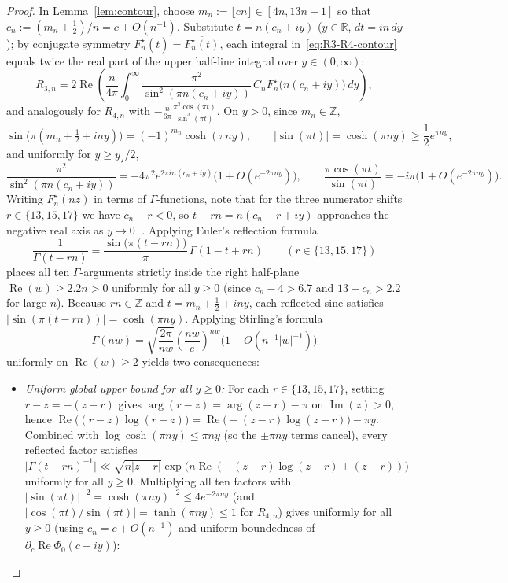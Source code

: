 \documentclass[11pt,reqno]{amsart}
\theoremstyle{definition}
\theoremstyle{remark}
\newcommand{\ZZ}{\mathbb{Z}}
\newcommand{\RR}{\mathbb{R}}
\begin{document}
\begin{proof}
In Lemma~\ref{lem:contour}, choose $m_n := \lfloor c n \rfloor \in [4n, 13n - 1]$ so that $c_n := (m_n + \frac{1}{2})/n = c + O(n^{-1})$. Substitute $t = n(c_n + i y)$ ($y \in \RR$, $dt = i n\, dy$); by conjugate symmetry $F_n^{\star}(\overline{t}) = \overline{F_n^{\star}(t)}$, each integral in~\eqref{eq:R3-R4-contour} equals twice the real part of the upper half-line integral over $y \in (0, \infty)$:
\[
  R_{3,n} = 2\operatorname{Re}\!\left(\frac{n}{4\pi} \int_0^{\infty} \frac{\pi^2}{\sin^2(\pi n(c_n + iy))}\, C_n F_n^{\star}\bigl(n(c_n + iy)\bigr)\, dy\right),
\]
and analogously for $R_{4,n}$ with $-\frac{n}{6\pi}\frac{\pi^3\cos(\pi t)}{\sin^3(\pi t)}$. On $y > 0$, since $m_n \in \ZZ$,
\[
  \sin\bigl(\pi(m_n + \tfrac{1}{2} + iny)\bigr) = (-1)^{m_n}\cosh(\pi ny),
  \qquad
  |\sin(\pi t)| = \cosh(\pi ny) \ge \frac{1}{2} e^{\pi ny},
\]
and uniformly for $y \ge y_\star/2$,
\[
  \frac{\pi^2}{\sin^2(\pi n(c_n + iy))} = -4\pi^2 e^{2\pi i n(c_n + iy)}\bigl(1 + O(e^{-2\pi n y})\bigr),
  \qquad
  \frac{\pi\cos(\pi t)}{\sin(\pi t)} = -i\pi\bigl(1 + O(e^{-2\pi n y})\bigr).
\]
Writing $F_n^{\star}(nz)$ in terms of $\Gamma$-functions, note that for the three numerator shifts $r \in \{13, 15, 17\}$ we have $c_n - r < 0$, so $t - rn = n(c_n - r + iy)$ approaches the negative real axis as $y \to 0^+$. Applying Euler's reflection formula
\[
  \frac{1}{\Gamma(t - rn)} = \frac{\sin\bigl(\pi(t - rn)\bigr)}{\pi}\,\Gamma(1 - t + rn)
  \qquad (r \in \{13, 15, 17\})
\]
places all ten $\Gamma$-arguments strictly inside the right half-plane $\operatorname{Re}(w) \ge 2.2 n > 0$ uniformly for all $y \ge 0$ (since $c_n - 4 > 6.7$ and $13 - c_n > 2.2$ for large $n$). Because $rn \in \ZZ$ and $t = m_n + \frac{1}{2} + iny$, each reflected sine satisfies $|\sin(\pi(t - rn))| = \cosh(\pi ny)$. Applying Stirling's formula
\[
  \Gamma(nw) = \sqrt{\frac{2\pi}{nw}}\left(\frac{nw}{e}\right)^{nw}\bigl(1 + O(n^{-1}|w|^{-1})\bigr)
\]
uniformly on $\operatorname{Re}(w) \ge 2$ yields two consequences:
\begin{itemize}
  \item \emph{Uniform global upper bound for all $y \ge 0$:} For each $r \in \{13, 15, 17\}$, setting $r - z = -(z - r)$ gives $\arg(r - z) = \arg(z - r) - \pi$ on $\operatorname{Im}(z) > 0$, hence $\operatorname{Re}\bigl((r - z)\log(r - z)\bigr) = \operatorname{Re}\bigl(-(z - r)\log(z - r)\bigr) - \pi y$. Combined with $\log\cosh(\pi ny) \le \pi ny$ (so the $\pm\pi ny$ terms cancel), every reflected factor satisfies $\bigl|\Gamma(t - rn)^{-1}\bigr| \ll \sqrt{n|z - r|}\exp\bigl(n\operatorname{Re}(-(z - r)\log(z - r) + (z - r))\bigr)$ uniformly for all $y \ge 0$. Multiplying all ten factors with $|\sin(\pi t)|^{-2} = \cosh(\pi ny)^{-2} \le 4 e^{-2\pi ny}$ (and $|\cos(\pi t)/\sin(\pi t)| = \tanh(\pi ny) \le 1$ for $R_{4,n}$) gives uniformly for all $y \ge 0$ (using $c_n = c + O(n^{-1})$ and uniform boundedness of $\partial_c \operatorname{Re}\Phi_0(c + iy)$):

\end{itemize}
\end{proof}
\end{document}
